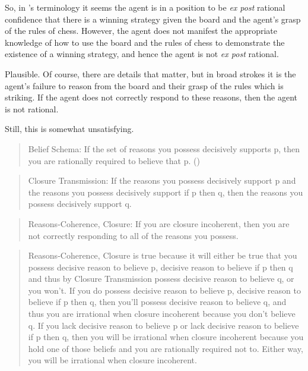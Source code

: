 \documentclass[10pt]{article}
\begin{document}
So, in \citeauthor{Lord:2018aa}'s terminology it seems the agent is in a position to be \emph{ex post} rational confidence that there is a winning strategy given the board and the agent's grasp of the rules of chess.
However, the agent does not manifest the appropriate knowledge of how to use the board and the rules of chess to demonstrate the existence of a winning strategy, and hence the agent is not \emph{ex post} rational.

Plausible.
Of course, there are details that matter, but in broad strokes it is the agent's failure to reason from the board and their grasp of the rules which is striking.
If the agent does not correctly respond to these reasons, then the agent is not rational.

Still, this is somewhat unsatisfying.


\begin{quote}
  Belief Schema: If the set of reasons you possess decisively supports p, then you are rationally required to believe that p.\nolinebreak
  \mbox{}\hfill\mbox{(\citeyear[28]{Lord:2018aa})}
\end{quote}

\begin{quote}
  Closure Transmission: If the reasons you possess decisively support p and the reasons you possess decisively support if p then q, then the reasons you possess decisively support q.
\end{quote}

\begin{quote}
  Reasons-Coherence, Closure: If you are closure incoherent, then you are not correctly responding to all of the reasons you possess.
\end{quote}

\begin{quote}
  Reasons-Coherence, Closure is true because it will either be true that you possess decisive reason to believe p, decisive reason to believe if p then q and thus by Closure Transmission possess decisive reason to believe q, or you won’t.
  If you do possess decisive reason to believe p, decisive reason to believe if p then q, then you’ll possess decisive reason to believe q, and thus you are irrational when closure incoherent because you don’t believe q.
  If you lack decisive reason to believe p or lack decisive reason to believe if p then q, then you will be irrational when closure incoherent because you hold one of those beliefs and you are rationally required not to.
  Either way, you will be irrational when closure incoherent.
\end{quote}
\end{document}
